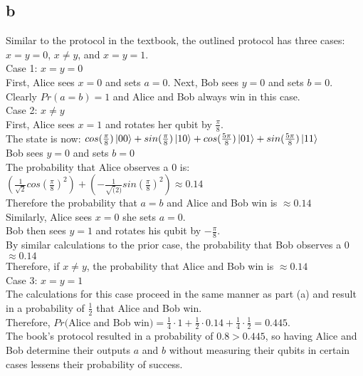 \documentclass[letterpaper,notitlepage,twoside]{article}
\newcommand\tab[1][1cm]{\hspace*{#1}} %
\begin{document}
\subsection*{b}
Similar to the protocol in the textbook, the outlined protocol has three cases: $x=y=0$, $x \neq y$, and $x=y=1$. \\
Case 1: $x=y=0$ \\
\tab First, Alice sees $x=0$ and sets $a=0$. Next, Bob sees $y=0$ and sets $b=0$. \\
\tab Clearly $Pr(a=b) = 1$ and Alice and Bob always win in this case. \\
Case 2: $x \neq y$ \\
\tab First, Alice sees $x=1$ and rotates her qubit by $\frac{\pi}{8}$.\\
\tab The state is now: $cos(\frac{\pi}{8}) \ket{00} + sin(\frac{\pi}{8}) \ket{10} + cos(\frac{5\pi}{8}) \ket{01} + sin(\frac{5\pi}{8}) \ket{11}$ \\
\tab Bob sees $y=0$ and sets $b=0$ \\
\tab The probability that Alice observes a 0 is: \\
\tab $(\frac{1}{\sqrt{2}}cos(\frac{\pi}{8})^{2}) + (-\frac{1}{\sqrt(2)}sin(\frac{\pi}{8})^{2}) \approx 0.14$ \\
\tab Therefore the probability that $a=b$ and Alice and Bob win is $\approx 0.14$ \\
\tab Similarly, Alice sees $x=0$ she sets $a=0$. \\
\tab Bob then sees $y=1$ and rotates his qubit by $-\frac{\pi}{8}$. \\
\tab By similar calculations to the prior case, the probability that Bob observes a 0 $\approx 0.14$ \\
\tab Therefore, if $x \neq y$, the probability that Alice and Bob win is $\approx 0.14$ \\
Case 3: $x=y=1$ \\
\tab The calculations for this case proceed in the same manner as part (a) and result in a probability of $\frac{1}{2}$ that  \tab Alice and Bob win. \\
Therefore, $Pr($Alice and Bob win$) = \frac{1}{4} \cdot 1 + \frac{1}{2} \cdot 0.14 + \frac{1}{4} \cdot \frac{1}{2} = 0.445$. \\
The book's protocol resulted in a probability of $0.8 > 0.445$, so having Alice and Bob determine their outputs $a$ and $b$ without measuring their qubits in certain cases lessens their probability of success.
\end{document}
